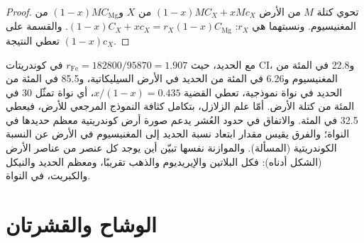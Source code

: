 \begin{proof}
تحوي كتلة $M$ من الأرض $(1-x)MC_X + xMc_X$ من $X$ و$(1-x)MC_{\mathrm{Mg}}$ من
المغنيسيوم. ونسبتهما هي $r_X$:
$(1-x)C_X + xc_X = r_X(1-x)C_{\mathrm{Mg}}$. والقسمة على $(1-x)c_X$ تعطي
النتيجة.
\end{proof}

مع الحديد، حيث $r_{\mathrm{Fe}} = \num{182800}/\num{95870} = 1.907$ في كوندريتات CI،
و22.8 في المئة من المغنيسيوم و6.26 في المئة من الحديد في الأرض السيليكاتية، و85.5 في
المئة من الحديد في نواة نموذجية، تعطي القضية $x/(1-x) = 0.435$، أي نواة تمثّل 30
في المئة من كتلة الأرض. أمّا علم الزلازل، بتكامل كثافة
النموذج المرجعي للأرض، فيعطي 32.5 في المئة. والاتفاق في حدود العُشر
يدعم صورة أرض كوندريتية معظم حديدها في النواة؛
والفرق يقيس مقدار ابتعاد نسبة الحديد إلى المغنيسيوم في الأرض عن
النسبة الكوندريتية (المسألة). والموازنة نفسها تبيّن أين يوجد كل عنصر من عناصر الأرض
(الشكل أدناه): فكل البلاتين والإيريديوم والذهب تقريبًا، ومعظم الحديد
والنيكل والكبريت، في النواة.

\begin{omfigure}
\centering
{}
\par{}
\end{omfigure}

\section{الوشاح والقشرتان}

